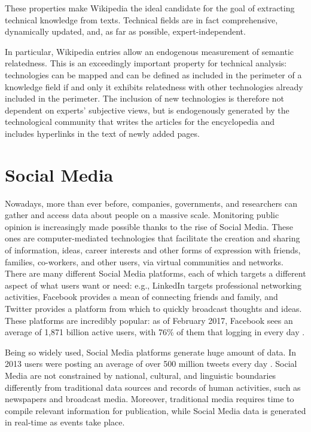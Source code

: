 \documentclass[]{book}
\begin{document}
These properties make Wikipedia the ideal candidate for the goal of
extracting technical knowledge from texts. Technical fields are in fact
comprehensive, dynamically updated, and, as far as possible,
expert-independent.

In particular, Wikipedia entries allow an endogenous measurement of
semantic relatedness. This is an exceedingly important property for
technical analysis: technologies can be mapped and can be defined as
included in the perimeter of a knowledge field if and only it exhibits
relatedness with other technologies already included in the perimeter.
The inclusion of new technologies is therefore not dependent on experts'
subjective views, but is endogenously generated by the technological
community that writes the articles for the encyclopedia and includes
hyperlinks in the text of newly added pages.

\section{Social Media}\label{sotadocumentstwitter}

Nowadays, more than ever before, companies, governments, and researchers
can gather and access data about people on a massive scale. Monitoring
public opinion is increasingly made possible thanks to the rise of
Social Media. These ones are computer-mediated technologies that
facilitate the creation and sharing of information, ideas, career
interests and other forms of expression with friends, families,
co-workers, and other users, via virtual communities and networks. There
are many different Social Media platforms, each of which targets a
different aspect of what users want or need: e.g., LinkedIn targets
professional networking activities, Facebook provides a mean of
connecting friends and family, and Twitter provides a platform from
which to quickly broadcast thoughts and ideas. These platforms are
incredibly popular: as of February 2017, Facebook sees an average of
1,871 billion active users, with 76\% of them that logging in every day
\citep{tuten2017social}.

Being so widely used, Social Media platforms generate huge amount of
data. In 2013 users were posting an average of over 500 million tweets
every day \citep{krikorian2013new}. Social Media are not constrained by
national, cultural, and linguistic boundaries differently from
traditional data sources and records of human activities, such as
newspapers and broadcast media. Moreover, traditional media requires
time to compile relevant information for publication, while Social Media
data is generated in real-time as events take place.
\end{document}
